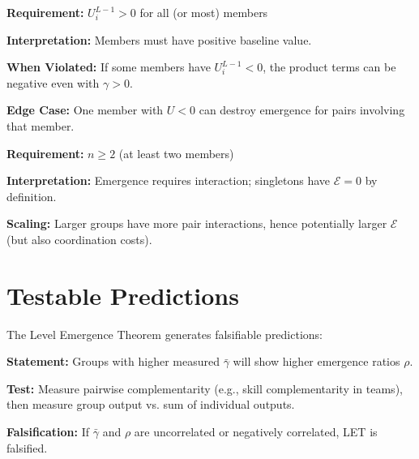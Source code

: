 \begin{tcolorbox}[colback=gray!5!white, colframe=gray!75!black,
    title=LET Condition 2: Positive Base Utilities]

\textbf{Requirement:} $U^{L-1}_i > 0$ for all (or most) members

\textbf{Interpretation:} Members must have positive baseline value.

\textbf{When Violated:} If some members have $U^{L-1}_i < 0$, the product
terms can be negative even with $\gamma > 0$.

\textbf{Edge Case:} One member with $U < 0$ can destroy emergence for
pairs involving that member.
\end{tcolorbox}

\begin{tcolorbox}[colback=gray!5!white, colframe=gray!75!black,
    title=LET Condition 3: Non-Degenerate Group]

\textbf{Requirement:} $n \geq 2$ (at least two members)

\textbf{Interpretation:} Emergence requires interaction; singletons have
$\mathcal{E} = 0$ by definition.

\textbf{Scaling:} Larger groups have more pair interactions, hence
potentially larger $\mathcal{E}$ (but also coordination costs).
\end{tcolorbox}


\section{Testable Predictions}
\label{sec:let-predictions}

The Level Emergence Theorem generates falsifiable predictions:

\begin{tcolorbox}[colback=green!5!white, colframe=green!75!black,
    title=Prediction LET-P1: Complementarity-Emergence Correlation]
\textbf{Statement:} Groups with higher measured $\bar{\gamma}$ will show
higher emergence ratios $\rho$.

\textbf{Test:} Measure pairwise complementarity (e.g., skill complementarity
in teams), then measure group output vs. sum of individual outputs.

\textbf{Falsification:} If $\bar{\gamma}$ and $\rho$ are uncorrelated or
negatively correlated, LET is falsified.
\end{tcolorbox}

